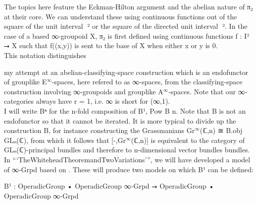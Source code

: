 \documentclass{book}
\theoremstyle{definition}
\begin{document}
The topics here feature the Eckman-Hilton argument and the abelian nature of π₂ at their core. We can understand these using continuous functions out of the square of the unit interval γ⃡² or the square of the directed unit interval γ⃗². In the case of a based ∞-groupoid X, π₂ is first defined using continuous functions f : I² ⭢ X such that f((x,y)) is sent to the base of X when either x or y is 0.\\

This notation distinguishes 

my attempt at an abelian-classifying-space construction which is an endofunctor of grouplike E${}^{\infty}$-spaces, here refered to as ∞-spaces, from the classifying-space construction involving ∞-groupoids and grouplike A${}^{\infty}$-spaces. Note that our ∞-categories always have r = 1, i.e. ∞ is short for (∞,1).\\

I will write Bⁿ for the n-fold composition of B¹, Pow B n. Note that B is not an endofunctor so that it cannot be iterated. It is more typical to divide up the construction B, for instance constructing the Grassmanians Gr${}^{\infty}$(ℂ,n) ≅ B.obj GLₙ(ℂ), from which it follows that [-,Gr${}^{\infty}$(ℂ,n)] is equivalent to the category of GLₙ(ℂ)-principal bundles and therefore to n-dimensional vector bundles bundles.\\

In ```TheWhiteheadTheoremandTwoVariations''', we will have developed a model of ∞-Grpd based on . These will produce two models on which B¹ can be defined:

\begin{center}
B¹ : OperadicGroup • OperadicGroup ∞-Grpd ⭢ OperadicGroup • OperadicGroup ∞-Grpd
\end{center}

\end{document}
